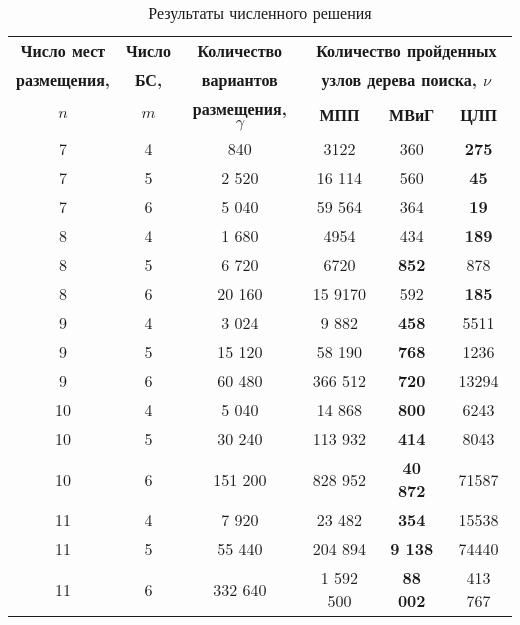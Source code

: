 \begin{frame}
    \small
    \begin{table}
        \caption{Результаты численного решения}\label{tab:models_comparation}
        \begin{tabular}{|ccc|*{3}{c}|} \cline{3-6}
        \hline
        \textbf{Число мест} & \textbf{Число} &\textbf{Количество} & \multicolumn{3}{c|}{\textbf{Количество пройденных}}\\ 
        \textbf{размещения,} & \textbf{БС,} & \textbf{вариантов} & \multicolumn{3}{c|}{\textbf{узлов дерева поиска, $\nu$}}\\
        \cline{4-6}
        \textbf{$n$} & \textbf{$m$} &\textbf{размещения, $\gamma$} & \textbf{МПП}& \textbf{МВиГ} & \textbf{ЦЛП} \\ 
        \hline
        7 &  4 & 840 & 3122 & 360 &  \textbf{275} \\
        7 &  5 & 2 520 & 16 114 & 560  &  \textbf{45}  \\
        7 &  6 & 5 040 & 59 564 & 364  &  \textbf{19}  \\
        8 &  4 & 1 680 &  4954 &  434 &   \textbf{189} \\
        8 &  5 & 6 720 & 6720 & \textbf{852}  &  878 \\
        8 &  6 & 20 160 &  15 9170 & 592  & \textbf{185}  \\
        9  &  4 & 3 024 & 9 882 & \textbf{458} & 5511 \\
        9  &  5 & 15 120&  58 190 &  \textbf{768} &  1236\\
        9  &  6 & 60 480&  366 512 &  \textbf{720} & 13294 \\
        10 &  4 & 5 040&  14 868&  \textbf{800}&  6243\\
        10 &	5 & 30 240&  113 932&  \textbf{414}&  8043\\
        10 &	6 & 151 200&  828 952&  \textbf{40 872}&  71587\\
        11 &  4 & 7 920& 23 482&  \textbf{354} & 15538\\
        11 &	5 & 55 440& 204 894& \textbf{9 138}&  74440\\
        11 &	6 & 332 640& 1 592 500 & \textbf{88 002} & 413 767 \\
        \hline
        \end{tabular}
      \end{table} 
\end{frame}

